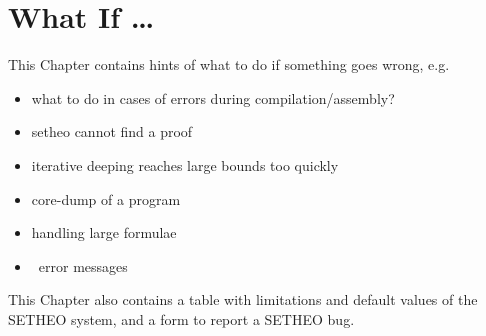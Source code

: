 \chapter{What If \ldots}\label{chap:8}

This Chapter contains hints of what to do if something goes wrong, e.g.

\begin{itemize}
\item
what to do in cases of errors during compilation/assembly?
\item
setheo cannot find a proof
\item
iterative deeping reaches large bounds too quickly
\item
core-dump of a program
\item
handling large formulae
\item
\SAM\ error messages
\end{itemize}

This Chapter also contains a table with limitations and default values
of the SETHEO system, and a form to report a SETHEO bug.




